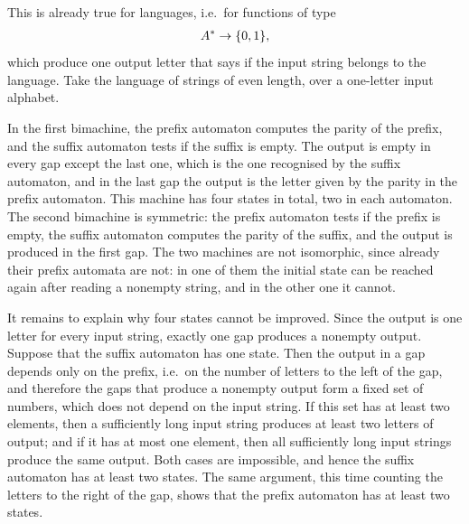 {This is already true for languages, i.e.~for functions of type
\begin{align*}
A^* \to \{0,1\},
\end{align*}
which produce one output letter that says if the input string belongs to the language. Take the language of strings of even length, over a one-letter input alphabet.

In the first bimachine, the prefix automaton computes the parity of the prefix, and the suffix automaton tests if the suffix is empty. The output is empty in every gap except the last one, which is the one recognised by the suffix automaton, and in the last gap the output is the letter given by the parity in the prefix automaton. This machine has four states in total, two in each automaton. The second bimachine is symmetric: the prefix automaton tests if the prefix is empty, the suffix automaton computes the parity of the suffix, and the output is produced in the first gap. The two machines are not isomorphic, since already their prefix automata are not: in one of them the initial state can be reached again after reading a nonempty string, and in the other one it cannot.

It remains to explain why four states cannot be improved. Since the output is one letter for every input string, exactly one gap produces a nonempty output. Suppose that the suffix automaton has one state. Then the output in a gap depends only on the prefix, i.e.~on the number of letters to the left of the gap, and therefore the gaps that produce a nonempty output form a fixed set of numbers, which does not depend on the input string. If this set has at least two elements, then a sufficiently long input string produces at least two letters of output; and if it has at most one element, then all sufficiently long input strings produce the same output. Both cases are impossible, and hence the suffix automaton has at least two states. The same argument, this time counting the letters to the right of the gap, shows that the prefix automaton has at least two states.
}


